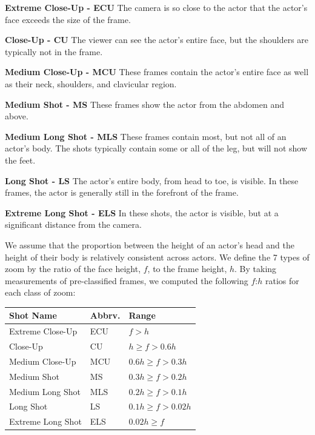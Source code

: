 
\textbf{Extreme Close-Up - ECU} The camera is so close to the actor that the actor's face exceeds the size of the frame.

\textbf{Close-Up - CU} The viewer can see the actor's entire face, but the shoulders are typically not in the frame. 

\textbf{Medium Close-Up - MCU} These frames contain the actor's entire face as well as their neck, shoulders, and clavicular region. 

\textbf{Medium Shot - MS} These frames show the actor from the abdomen and above. 

\textbf{Medium Long Shot - MLS} These frames contain most, but not all of an actor's body. The shots typically contain some or all of the leg, but will not show the feet. %

\textbf{Long Shot - LS} The actor's entire body, from head to toe, is visible. In these frames, the actor is generally still in the forefront of the frame. 

\textbf{Extreme Long Shot - ELS} In these shots, the actor is visible, but at a significant distance from the camera. 


We assume that the proportion between the height of an actor's head and the height of their body is relatively consistent across actors. We define the 7 types of zoom by the ratio of the face height, $f$, to the frame height, $h$. By taking measurements of pre-classified frames, we computed the following $f$:$h$ ratios for each class of zoom:

\begin{center}
  \small{
  \begin{tabular}{ l | l l}
    Shot Name & Abbrv. & Range \\ \hline
    Extreme Close-Up & ECU & $f > h$ \\ 
    Close-Up & CU & $h \geq f > 0.6h$ \\ 
    Medium Close-Up & MCU & $0.6h \geq f > 0.3h$ \\ 
    Medium Shot & MS & $0.3h \geq f > 0.2h$ \\ 
    Medium Long Shot & MLS & $0.2h \geq f > 0.1h$ \\ 
    Long Shot & LS & $0.1h \geq f > 0.02h$ \\ 
    Extreme Long Shot & ELS & $0.02h \geq f$
    \label{tab:zoomTypes}
  \end{tabular}
  }
\end{center}

